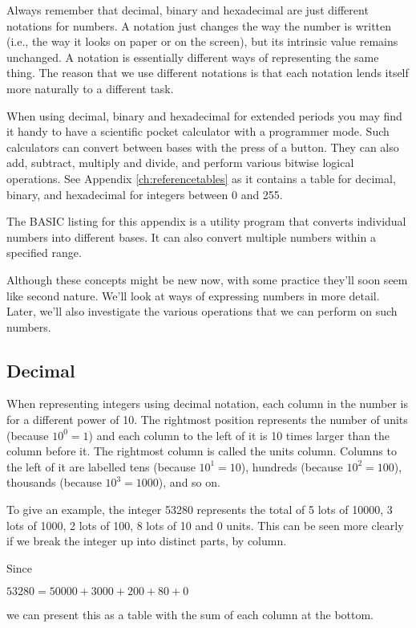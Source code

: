 Always remember that decimal, binary and hexadecimal are just different notations for numbers. A notation just changes the way the number is written (i.e., the way it looks on paper or on the screen), but its intrinsic value remains unchanged. A notation is essentially different ways of representing the same thing. The reason that we use different notations is that each notation lends itself more naturally to a different task.

When using decimal, binary and hexadecimal for extended periods you may find it handy to have a scientific pocket calculator with a programmer mode. Such calculators can convert between bases with the press of a button. They can also add, subtract, multiply and divide, and perform various bitwise logical operations.
See Appendix \ref{ch:referencetables}   as it contains a  table for decimal, binary, and hexadecimal for integers between 0 and 255.

The BASIC listing for this appendix is a utility program that converts individual numbers into different bases. It can also convert multiple numbers within a specified range.

Although these concepts might be new now, with some practice they'll soon seem like second nature. We’ll look at ways of expressing numbers in more detail. Later, we’ll also investigate the various operations that we can perform on such numbers.

\subsection{Decimal}
When representing integers using decimal notation, each column in the number is for a different power of 10. The rightmost position represents the number of units (because $10^{0} = 1$) and each column to the left of it is 10 times larger than the column before it. The rightmost column is called the units column. Columns to the left of it are labelled tens (because $10^{1} = 10$), hundreds (because $10^{2} = 100$), thousands (because $10^{3} = 1000$), and so on.

To give an example, the integer 53280 represents the total of 5 lots of 10000, 3 lots of 1000, 2 lots of 100, 8 lots of 10 and 0 units. This can be seen more clearly if we break the integer up into distinct parts, by column.

Since
\begin{center}
  $53280 = 50000 + 3000 + 200 + 80 + 0$
\end{center}
we can present this as a table with the sum of each column at the bottom.

